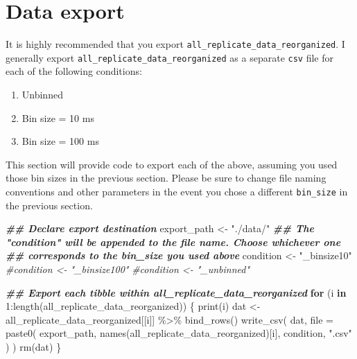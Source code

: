 \documentclass[
]{book}
\newenvironment{Shaded}{\begin{snugshade}}{\end{snugshade}}
\newcommand{\AttributeTok}[1]{\textcolor[rgb]{0.77,0.63,0.00}{#1}}
\newcommand{\CommentTok}[1]{\textcolor[rgb]{0.56,0.35,0.01}{\textit{#1}}}
\newcommand{\ControlFlowTok}[1]{\textcolor[rgb]{0.13,0.29,0.53}{\textbf{#1}}}
\newcommand{\DecValTok}[1]{\textcolor[rgb]{0.00,0.00,0.81}{#1}}
\newcommand{\DocumentationTok}[1]{\textcolor[rgb]{0.56,0.35,0.01}{\textbf{\textit{#1}}}}
\newcommand{\FunctionTok}[1]{\textcolor[rgb]{0.00,0.00,0.00}{#1}}
\newcommand{\NormalTok}[1]{#1}
\newcommand{\OtherTok}[1]{\textcolor[rgb]{0.56,0.35,0.01}{#1}}
\newcommand{\SpecialCharTok}[1]{\textcolor[rgb]{0.00,0.00,0.00}{#1}}
\newcommand{\StringTok}[1]{\textcolor[rgb]{0.31,0.60,0.02}{#1}}
\providecommand{\tightlist}{%
  \setlength{\itemsep}{0pt}\setlength{\parskip}{0pt}}
\begin{document}
\hypertarget{data-export}{%
\section{Data export}\label{data-export}}

It is highly recommended that you export \texttt{all\_replicate\_data\_reorganized}. I
generally export \texttt{all\_replicate\_data\_reorganized} as a separate \texttt{csv} file for
each of the following conditions:

\begin{enumerate}
\def\labelenumi{\arabic{enumi}.}
\tightlist
\item
  Unbinned
\item
  Bin size = 10 ms
\item
  Bin size = 100 ms
\end{enumerate}

This section will provide code to export each of the above, assuming you used
those bin sizes in the previous section. Please be sure to change file naming
conventions and other parameters in the event you chose a different \texttt{bin\_size}
in the previous section.

\begin{Shaded}
\begin{Highlighting}[]
\DocumentationTok{\#\# Declare export destination}
\NormalTok{export\_path }\OtherTok{\textless{}{-}} \StringTok{"./data/"}
\DocumentationTok{\#\# The "condition" will be appended to the file name. Choose whichever one}
\DocumentationTok{\#\# corresponds to the bin\_size you used above}
\NormalTok{condition }\OtherTok{\textless{}{-}}  \StringTok{"\_binsize10"}
\CommentTok{\#condition \textless{}{-}  "\_binsize100"}
\CommentTok{\#condition \textless{}{-}  "\_unbinned"}

\DocumentationTok{\#\# Export each tibble within all\_replicate\_data\_reorganized}
\ControlFlowTok{for}\NormalTok{ (i }\ControlFlowTok{in} \DecValTok{1}\SpecialCharTok{:}\FunctionTok{length}\NormalTok{(all\_replicate\_data\_reorganized)) \{}
  \FunctionTok{print}\NormalTok{(i)}
\NormalTok{  dat }\OtherTok{\textless{}{-}}
\NormalTok{    all\_replicate\_data\_reorganized[[i]] }\SpecialCharTok{\%\textgreater{}\%}
    \FunctionTok{bind\_rows}\NormalTok{()}
  \FunctionTok{write\_csv}\NormalTok{(}
\NormalTok{    dat,}
    \AttributeTok{file =}
      \FunctionTok{paste0}\NormalTok{(}
\NormalTok{        export\_path,}
        \FunctionTok{names}\NormalTok{(all\_replicate\_data\_reorganized)[i],}
\NormalTok{        condition,}
        \StringTok{".csv"}
\NormalTok{      )}
\NormalTok{  )}
  \FunctionTok{rm}\NormalTok{(dat)}
\NormalTok{\}}
\end{Highlighting}
\end{Shaded}
\end{document}
